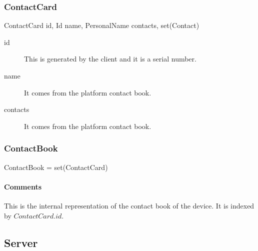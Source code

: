 \documentclass[a4paper,10pt]{article}
\begin{document}
\subsubsection{ContactCard}

\begin{verbbox}
ContactCard
{
  id, Id
  name, PersonalName
  contacts, set(Contact)
}
\end{verbbox}
\begin{center}
\theverbbox
\end{center}

\begin{inparaitem}[ ]
 \item \infrastructure
\end{inparaitem}

\SpecialItem
\begin{description}
 \item[id] This is generated by the client and it is a serial number.
 \item[name] It comes from the platform contact book.
 \item[contacts] It comes from the platform contact book.
\end{description}

\subsubsection{ContactBook}

\begin{verbbox}
ContactBook = set(ContactCard)
\end{verbbox}
\begin{center}
\theverbbox
\end{center}

\begin{inparaitem}[ ]
 \item \persistent
 \item \unsecure
 \item \unique
\end{inparaitem}

\paragraph*{Comments}
This is the internal representation of the contact book of the device. It is indexed by $ContactCard.id$.

\subsection{Server}
\label{sec:structure:server}
\end{document}
